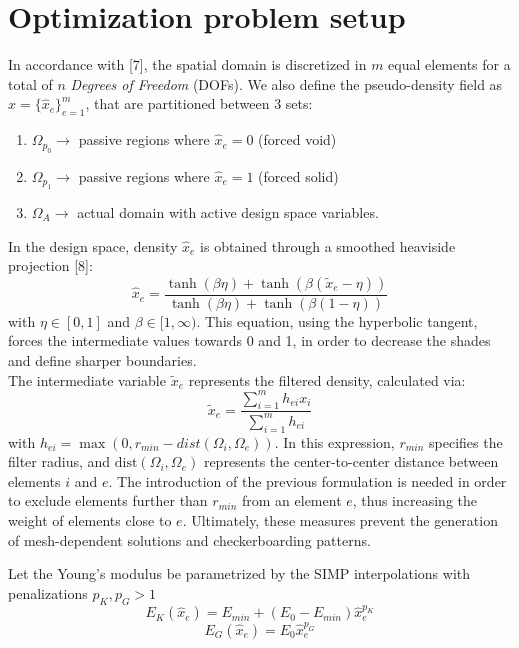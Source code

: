 \documentclass{article}
\begin{document}
\section{Optimization problem setup}

\noindent In accordance with [7], the spatial domain is discretized in $m$ equal elements for a total of $n$ \textit{Degrees of Freedom} (DOFs). We also define the pseudo-density field as $\hat{x} = \{\hat{x}_e\}_{e=1}^m$, that are partitioned between 3 sets:
\begin{enumerate}
    \item $\Omega_{p_0} \rightarrow$ passive regions where $\hat{x}_e = 0$ (forced void)
    \item $\Omega_{p_1} \rightarrow$ passive regions where $\hat{x}_e = 1$ (forced solid)
    \item $\Omega_A \rightarrow$ actual domain with active design space variables.
\end{enumerate}

In the design space, density $\hat{x}_e$ is obtained through a smoothed heaviside projection [8]:
\begin{equation}
\hat{x}_e = \frac{\tanh(\beta\eta) + \tanh(\beta(\tilde{x}_e - \eta))}{\tanh(\beta\eta) + \tanh(\beta(1 - \eta))}
\end{equation}
\noindent with $\eta \in [0, 1]$ and $\beta \in [1, \infty)$. This equation, using the hyperbolic tangent, forces the intermediate values towards 0 and 1, in order to decrease the shades and define sharper boundaries. \\
\noindent The intermediate variable $\tilde{x}_e$ represents the filtered density, calculated via:
\begin{equation}
\tilde{x}_e = \frac{\sum_{i=1}^m h_{ei} x_i}{\sum_{i=1}^m h_{ei}}
\end{equation}
\noindent with $h_{ei} = \max(0, r_{min} - dist(\Omega_i, \Omega_e))$. In this expression, $r_{min}$ specifies the filter radius, and $\text{dist}(\Omega_i, \Omega_e)$ represents the center-to-center distance between elements $i$ and $e$. The introduction of the previous formulation is needed in order to exclude elements further than $r_{min}$ from an element $e$, thus increasing the weight of elements close to $e$. Ultimately, these measures prevent the generation of mesh-dependent solutions and checkerboarding patterns.

\vspace{\baselineskip}
Let the Young's modulus be parametrized by the SIMP interpolations with penalizations $p_K, p_G > 1$
\begin{equation}
E_K(\hat{x}_e) = E_{min} + (E_0 - E_{min})\hat{x}_e^{p_K}
\end{equation}
\begin{equation}
E_G(\hat{x}_e) = E_0 \hat{x}_e^{p_G}
\end{equation}
\end{document}
